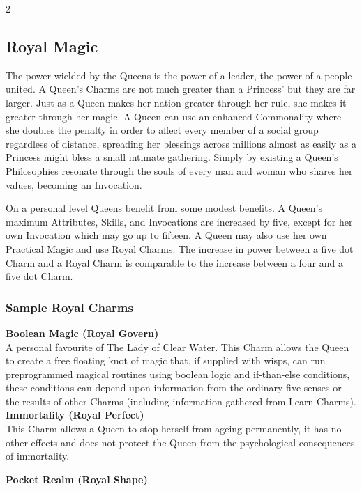 \begin{multicols}{2}
\subsection*{Royal Magic}

The power wielded by the Queens is the power of a leader, the power of a people united. A Queen's Charms are not much greater than a Princess' but they are far larger. Just as a Queen makes her nation greater through her rule, she makes it greater through her magic. A Queen can use an enhanced Commonality where she doubles the penalty in order to affect every member of a social group regardless of distance, spreading her blessings across millions almost as easily as a Princess might bless a small intimate gathering. Simply by existing a Queen's Philosophies resonate through the souls of every man and woman who shares her values, becoming an Invocation. 

On a personal level Queens benefit from some modest benefits. A Queen's maximum Attributes, Skills, and Invocations are increased by five, except for her own Invocation which may go up to fifteen. A Queen may also use her own Practical Magic and use Royal Charms. The increase in power between a five dot Charm and a Royal Charm is comparable to the increase between a four and a five dot Charm.

\subsubsection*{Sample Royal Charms}

\textbf{Boolean Magic (Royal Govern)}\\

\noindent A personal favourite of The Lady of Clear Water. This Charm allows the Queen to create a free floating knot of magic that, if supplied with wisps, can run preprogrammed magical routines using boolean logic and if-than-else conditions, these conditions can depend upon information from the ordinary five senses or the results of other Charms (including information gathered from Learn Charms).\\

\noindent \textbf{Immortality (Royal Perfect)}\\

\noindent This Charm allows a Queen to stop herself from ageing permanently, it has no other effects and does not protect the Queen from the psychological consequences of immortality.

\noindent \textbf{Pocket Realm (Royal Shape)}\\


\end{multicols}
